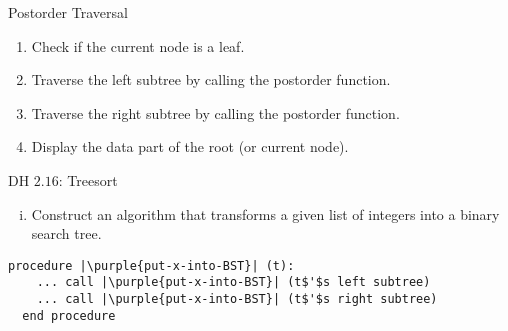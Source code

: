 \begin{frame}{Postorder Traversal}

  \begin{enumerate}
    \item Check if the current node is a leaf.
    \item Traverse the left subtree by  calling the postorder function.
    \item Traverse the right subtree by  calling the postorder function.
    \item Display the data part of the root (or current node).
  \end{enumerate}
\end{frame}

\begin{frame}[fragile]{}
  \begin{exampleblock}{DH $2.16$: Treesort}
    \begin{enumerate}[(i)]
      \item Construct an algorithm that transforms a given list of integers into a binary search tree.
    \end{enumerate}
  \end{exampleblock}

  \pause
  \vspace{0.60cm}
  \begin{lstlisting}[style = Cstyle]
  procedure |\purple{put-x-into-BST}| (t):
    ... call |\purple{put-x-into-BST}| (t$'$s left subtree)
    ... call |\purple{put-x-into-BST}| (t$'$s right subtree)
  end procedure
  \end{lstlisting}
\end{frame}

